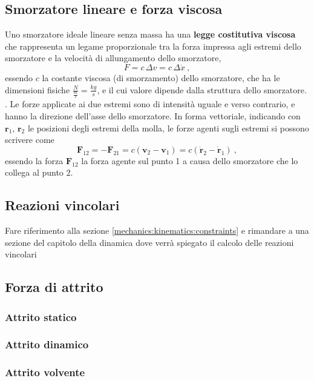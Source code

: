 \subsection{Smorzatore lineare e forza viscosa}
Uno smorzatore ideale lineare senza massa ha una \textbf{legge costitutiva viscosa} che rappresenta un legame proporzionale tra la forza impressa agli estremi dello smorzatore e la velocità di allungamento dello smorzatore,
\begin{equation}
    F = c \, \Delta v = c \, \Delta \dot{x} \ ,
\end{equation}
essendo $c$ la costante viscosa (di smorzamento) dello smorzatore, che ha le dimensioni fisiche $\frac{N}{\frac{m}{s}} = \frac{kg}{s}$, e il cui valore dipende dalla struttura dello smorzatore.
.
Le forze applicate ai due estremi sono di intensità uguale e verso contrario, e hanno la direzione dell'asse dello smorzatore. In forma vettoriale, indicando con $\mathbf{r}_1$, $\mathbf{r}_2$ le posizioni degli estremi della molla, le forze agenti sugli estremi si possono scrivere come
\begin{equation}
    \mathbf{F}_{12} = - \mathbf{F}_{21} = c \left( \mathbf{v}_2 - \mathbf{v}_1 \right)  = c \left( \dot{\mathbf{r}}_2 - \dot{\mathbf{r}}_1 \right) \ ,
\end{equation}
essendo la forza $\mathbf{F}_{12}$ la forza agente sul punto 1 a causa dello smorzatore che lo collega al punto 2.
\subsection{Reazioni vincolari}
{\color{red} Fare riferimento alla sezione \ref{mechanics:kinematics:constraints} e rimandare a una sezione del capitolo della dinamica dove verrà spiegato il calcolo delle reazioni vincolari}
\subsection{Forza di attrito}
\subsubsection{Attrito statico}
\subsubsection{Attrito dinamico}
\subsubsection{Attrito volvente}


